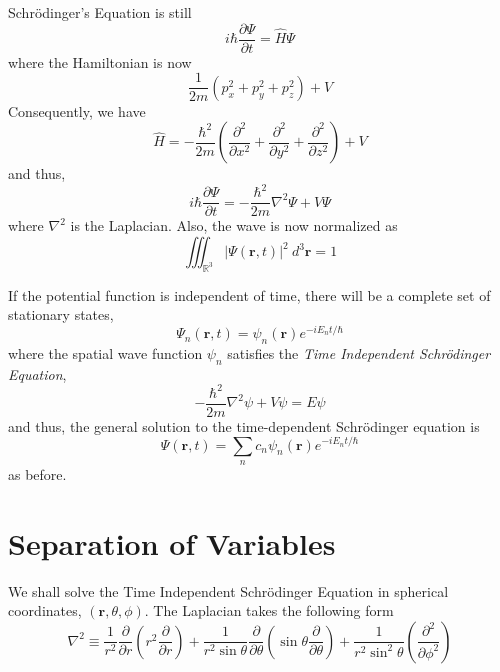 Schr\"odinger's Equation is still
\begin{equation*}
    i\hbar\frac{\partial\Psi}{\partial t} = \widehat{H}\Psi
\end{equation*}
where the Hamiltonian is now 
\begin{equation*}
    \frac{1}{2m}\left(p_x^2 + p_y^2 + p_z^2\right) + V
\end{equation*}
Consequently, we have 
\begin{equation*}
    \widehat{H} = -\frac{\hbar^2}{2m}\left(\frac{\partial^2}{\partial x^2} + \frac{\partial^2}{\partial y^2} + \frac{\partial^2}{\partial z^2}\right) + V
\end{equation*}
and thus,
\begin{equation*}
    i\hbar\frac{\partial\Psi}{\partial t} = -\frac{\hbar^2}{2m}\nabla^2\Psi + V\Psi
\end{equation*}
where $\nabla^2$ is the Laplacian. Also, the wave is now normalized as 
\begin{equation*}
    \iiint_{\mathbb{R}^3}\left|\Psi(\mathbf{r}, t)\right|^2~d^3\mathbf{r} = 1
\end{equation*}

If the potential function is independent of time, there will be a complete set of stationary states,
\begin{equation*}
    \Psi_n(\mathbf{r},t) = \psi_n(\mathbf{r})e^{-iE_nt/\hbar}
\end{equation*}
where the spatial wave function $\psi_n$ satisfies the \textit{Time Independent Schr\"odinger Equation},
\begin{equation*}
    -\frac{\hbar^2}{2m}\nabla^2\psi + V\psi = E\psi
\end{equation*}
and thus, the general solution to the time-dependent Schr\"odinger equation is 
\begin{equation*}
    \Psi(\mathbf{r},t) = \sum_n c_n\psi_n(\mathbf{r})e^{-iE_nt/\hbar}
\end{equation*}
as before.

\section{Separation of Variables}
We shall solve the Time Independent Schr\"odinger Equation in spherical coordinates, $(\mathbf{r},\theta,\phi)$. The Laplacian takes the following form
\begin{equation*}
    \nabla^2\equiv\frac{1}{r^2}\frac{\partial}{\partial r}\left(r^2\frac{\partial}{\partial r}\right) + \frac{1}{r^2\sin\theta}\frac{\partial}{\partial\theta}\left(\sin\theta\frac{\partial}{\partial\theta}\right) + \frac{1}{r^2\sin^2\theta}\left(\frac{\partial^2}{\partial\phi^2}\right)
\end{equation*}

